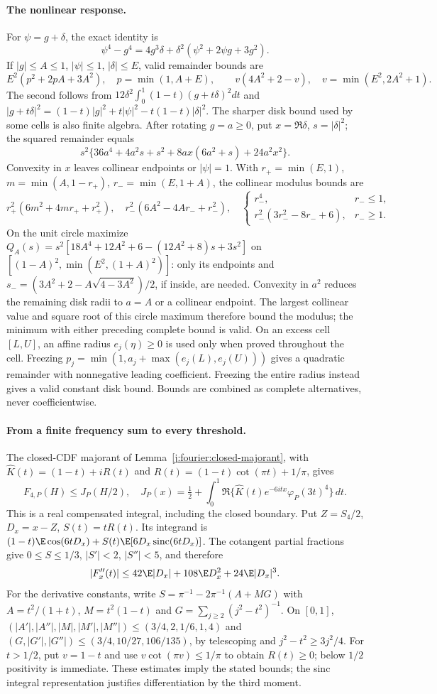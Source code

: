 \paragraph{The nonlinear response.}
For $\psi=g+\delta$, the exact identity is
\[
 \psi^4-g^4=4g^3\delta+\delta^2(\psi^2+2\psi g+3g^2).
\]
If $|g|\le A\le1$, $|\psi|\le1$, $|\delta|\le E$, valid
remainder bounds are
\[
 E^2(p^2+2pA+3A^2),\quad p=\min(1,A+E),\qquad
 v(4A^2+2-v),\quad v=\min(E^2,2A^2+1).
\]
The second follows from
$12\delta^2\int_0^1(1-t)(g+t\delta)^2dt$ and
$|g+t\delta|^2=(1-t)|g|^2+t|\psi|^2-t(1-t)|\delta|^2$.
The sharper disk bound used by some cells is also finite algebra.
After rotating $g=a\ge0$, put $x=\Re\delta$, $s=|\delta|^2$;
the squared remainder equals
\[
 s^2\{36a^4+4a^2s+s^2+8ax(6a^2+s)+24a^2x^2\}.
\]
Convexity in $x$ leaves collinear endpoints or $|\psi|=1$.
With $r_+=\min(E,1)$, $m=\min(A,1-r_+)$, $r_-=\min(E,1+A)$,
the collinear modulus bounds are
\[
 r_+^2(6m^2+4mr_++r_+^2),\quad r_-^2(6A^2-4Ar_-+r_-^2),\quad
 \begin{cases}r_-^4,&r_-\le1,\\r_-^2(3r_-^2-8r_-+6),&r_-\ge1.
 \end{cases}
\]
On the unit circle maximize
$Q_A(s)=s^2[18A^4+12A^2+6-(12A^2+8)s+3s^2]$
on $[(1-A)^2,\min(E^2,(1+A)^2)]$: only its endpoints and
$s_-=(3A^2+2-A\sqrt{4-3A^2})/2$, if inside, are needed.
Convexity in $a^2$ reduces the remaining disk radii to $a=A$ or a
collinear endpoint. The largest collinear value and square root of
this circle maximum therefore bound the modulus; the minimum with
either preceding complete bound is valid.
On an excess cell $[L,U]$, an affine radius $e_j(\eta)\ge0$ is
used only when proved throughout the cell. Freezing
$p_j=\min(1,a_j+\max(e_j(L),e_j(U)))$ gives a quadratic remainder
with nonnegative leading coefficient. Freezing the entire radius
instead gives a valid constant disk bound. Bounds are combined as
complete alternatives, never coefficientwise.

\paragraph{From a finite frequency sum to every threshold.}
The closed-CDF majorant of Lemma~\ref{j:fourier:closed-majorant}, with
$\widehat K(t)=(1-t)+iR(t)$ and
$R(t)=(1-t)\cot(\pi t)+1/\pi$, gives
\[
 F_{4,P}(H)\le J_P(H/2),\quad
 J_P(x)=\tfrac12+\int_0^1
 \Re\{\widehat K(t)e^{-6itx}\varphi_P(3t)^4\}\,dt.
\]
This is a real compensated integral, including the closed boundary.
Put $Z=S_4/2$, $D_x=x-Z$, $S(t)=tR(t)$. Its integrand is
$(1-t)\E\cos(6tD_x)+S(t)\E[6D_x\operatorname{sinc}(6tD_x)]$.
The cotangent partial fractions give $0\le S\le1/3$,
$|S'|<2$, $|S''|<5$, and therefore
\[
 |F_x''(t)|\le42\E|D_x|+108\E D_x^2+24\E|D_x|^3.
\]
For the derivative constants, write
$S=\pi^{-1}-2\pi^{-1}(A+MG)$ with
$A=t^2/(1+t)$, $M=t^2(1-t)$ and
$G=\sum_{j\ge2}(j^2-t^2)^{-1}$.
On $[0,1]$, $(|A'|,|A''|,|M|,|M'|,|M''|)\le(3/4,2,1/6,1,4)$
and $(G,|G'|,|G''|)\le(3/4,10/27,106/135)$, by telescoping and
$j^2-t^2\ge3j^2/4$. For $t>1/2$, put $v=1-t$ and use $v\cot(\pi v)\le1/\pi$
to obtain $R(t)\ge0$; below $1/2$ positivity is immediate.
These estimates imply the stated bounds; the sinc
integral representation justifies differentiation by the third moment.


